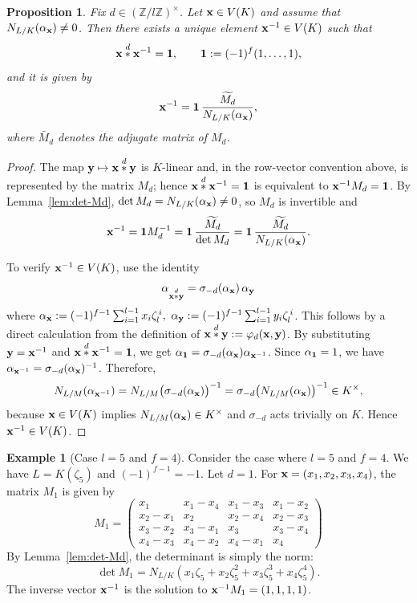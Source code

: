 \documentclass[a4paper, 11pt]{amsart}
\newcommand{\Z}{\mathbb Z}
\theoremstyle{plain}
\newtheorem{prop}[thm]{Proposition}
\theoremstyle{definition}
\newtheorem{example}[thm]{Example}
\numberwithin{equation}{section}
\begin{document}
\begin{prop}\label{prop:inverse}
Fix $d\in (\Z/l\Z)^\times$. Let ${\bf x}\in V(K)$ and assume that $N_{L/K}(\alpha_{\bf x})\neq 0$.
Then there exists a unique element ${\bf x}^{-1}\in V(K)$ such that
\[
{\bf x}\overset{d}{\ast}{\bf x}^{-1}={\bf 1},\qquad {\bf 1}:=(-1)^f(1,\dots,1),
\]
and it is given by
\[
{\bf x}^{-1}={\bf 1}\,\frac{\widetilde{M_d}}{N_{L/K}(\alpha_{\bf x})},
\]
where $\widetilde{M_d}$ denotes the adjugate matrix of $M_d$.
\end{prop}

\begin{proof}
The map ${\bf y}\mapsto{\bf x}\overset{d}{\ast}{\bf y}$ is $K$-linear and, in the row-vector convention above, is represented by the matrix $M_d$; hence
${\bf x}\overset{d}{\ast}{\bf x}^{-1}={\bf 1}$ is equivalent to ${\bf x}^{-1}M_d ={\bf 1}$.
By Lemma~\ref{lem:det-Md}, $\det M_d=N_{L/K}(\alpha_{\bf x})\neq 0$, so $M_d$ is invertible and
\[
{\bf x}^{-1}={\bf 1}M_d^{-1}={\bf 1}\,\frac{\widetilde{M_d}}{\det M_d}
={\bf 1}\,\frac{\widetilde{M_d}}{N_{L/K}(\alpha_{\bf x})}.
\]

To verify ${\bf x}^{-1}\in V(K)$, use the identity
\[
\alpha_{{\bf x}\overset{d}{\ast}{\bf y}}=\sigma_{-d}(\alpha_{\bf x})\,\alpha_{\bf y}
\]
where $\alpha_{\bf x}:=(-1)^{f-1}\sum_{i=1}^{l-1}x_i\zeta_l^{\,i},\ 
\alpha_{\bf y}:=(-1)^{f-1}\sum_{i=1}^{l-1}y_i\zeta_l^{\,i}$.
This follows by a direct calculation from the definition of ${\bf x}\overset{d}{\ast}{\bf y}:=\varphi_{d}({\bf x},{\bf y})$.
By substituting ${\bf y}={\bf x}^{-1}$ and ${\bf x}\overset{d}{\ast}{\bf x}^{-1}={\bf 1}$, we get
$\alpha_{\bf 1}=\sigma_{-d}(\alpha_{\bf x})\alpha_{{\bf x}^{-1}}$.
Since $\alpha_{\bf 1}=1$, we have $\alpha_{{\bf x}^{-1}}=\sigma_{-d}(\alpha_{\bf x})^{-1}$.
Therefore,
\[
N_{L/M}(\alpha_{{\bf x}^{-1}})
= N_{L/M}\bigl(\sigma_{-d}(\alpha_{\bf x})\bigr)^{-1}
= \sigma_{-d}\bigl(N_{L/M}(\alpha_{\bf x})\bigr)^{-1}\in K^\times,
\]
because ${\bf x}\in V(K)$ implies $N_{L/M}(\alpha_{\bf x})\in K^\times$ and $\sigma_{-d}$ acts trivially on $K$.
Hence ${\bf x}^{-1}\in V(K)$.
\end{proof}

\begin{example}[Case $l=5$ and $f=4$]
Consider the case where $l=5$ and $f=4$. 
We have $L=K(\zeta_5)$ and $(-1)^{f-1}=-1$. 
Let $d=1$.
For ${\bf x} = (x_1, x_2, x_3, x_4)$, the matrix $M_1$ is given by
\[
M_1=
\begin{pmatrix}
x_1 & x_1-x_4 & x_1-x_3 & x_1-x_2\\
x_2-x_1 & x_2 & x_2-x_4 & x_2-x_3\\
x_3-x_2 & x_3-x_1 & x_3 & x_3-x_4\\
x_4-x_3 & x_4-x_2 & x_4-x_1 & x_4
\end{pmatrix}
\]
By Lemma~\ref{lem:det-Md}, the determinant is simply the norm:
\[
    \det M_1 = N_{L/K}(x_1\zeta_5 + x_2\zeta_5^2 + x_3\zeta_5^3 + x_4\zeta_5^4).
\]
The inverse vector ${\bf x}^{-1}$ is the solution to ${\bf x}^{-1} M_1  = (1,1,1,1)$.
\end{example}
\end{document}
